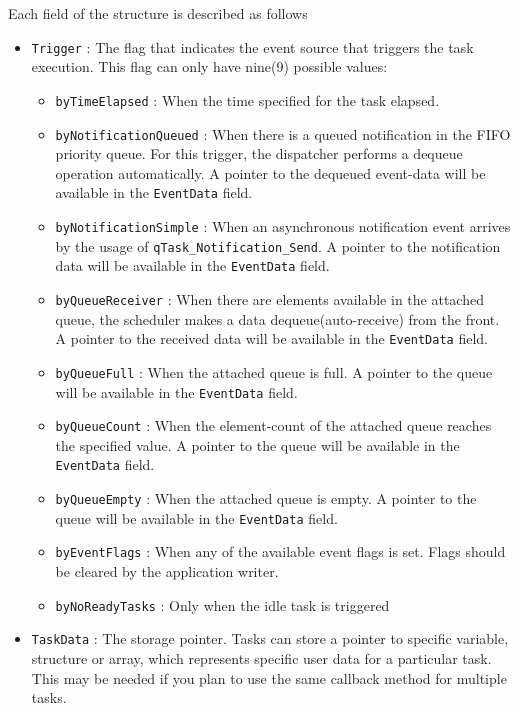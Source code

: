Each field of the structure is described as follows
\begin{itemize}
    \item \lstinline{Trigger} : The flag that indicates the event source that triggers the task execution. This flag can only have nine(9) possible values:
    \begin{itemize}
        \item \lstinline{byTimeElapsed}  : When the time specified for the task elapsed.
        \item \lstinline{byNotificationQueued} : When there is a queued notification in the FIFO priority queue. For this trigger, the dispatcher performs a dequeue operation automatically. A pointer to the dequeued event-data will be available in the \lstinline{EventData}  field.
        \item \lstinline{byNotificationSimple} : When an asynchronous notification event  arrives by the usage of \lstinline{qTask_Notification_Send}. A pointer to the notification data will be available in the \lstinline{EventData} field.
        \item \lstinline{byQueueReceiver} : When there are elements available in the attached queue, the scheduler makes a data dequeue(auto-receive) from the front. A pointer to the received data will be available in the \lstinline{EventData} field.
        \item \lstinline{byQueueFull} : When the attached queue is full. A pointer to the queue will be available in the \lstinline{EventData} field.
        \item \lstinline{byQueueCount} : When the element-count of the  attached queue reaches
        the specified value. A pointer to the queue will be available in the \lstinline{EventData} field.
        \item \lstinline{byQueueEmpty} : When the attached queue is empty. A pointer to the queue will be available in the \lstinline{EventData} field.
        \item \lstinline{byEventFlags} : When any of the available event flags is set. Flags should be cleared by the application writer.
        \item \lstinline{byNoReadyTasks} : Only when the idle task is triggered
    \end{itemize}
    \item \lstinline{TaskData} : The storage pointer. Tasks can store a pointer to specific variable, structure or array, which represents specific user data for a particular task. This may be needed if you plan to use the same callback method for multiple tasks.

\end{itemize}
